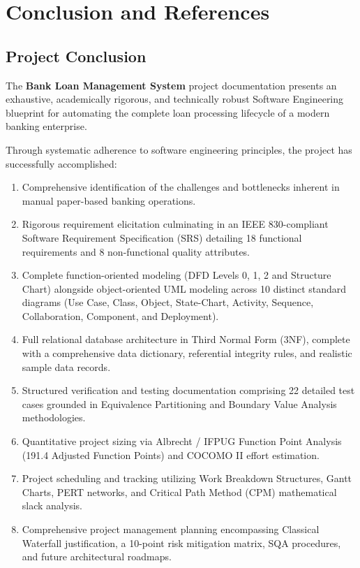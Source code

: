 \chapter{Conclusion and References}

\section{Project Conclusion}

The \textbf{Bank Loan Management System} project documentation presents an exhaustive, academically rigorous, and technically robust Software Engineering blueprint for automating the complete loan processing lifecycle of a modern banking enterprise.

Through systematic adherence to software engineering principles, the project has successfully accomplished:

\begin{enumerate}
  \item Comprehensive identification of the challenges and bottlenecks inherent in manual paper-based banking operations.
  \item Rigorous requirement elicitation culminating in an IEEE 830-compliant Software Requirement Specification (SRS) detailing 18 functional requirements and 8 non-functional quality attributes.
  \item Complete function-oriented modeling (DFD Levels 0, 1, 2 and Structure Chart) alongside object-oriented UML modeling across 10 distinct standard diagrams (Use Case, Class, Object, State-Chart, Activity, Sequence, Collaboration, Component, and Deployment).
  \item Full relational database architecture in Third Normal Form (3NF), complete with a comprehensive data dictionary, referential integrity rules, and realistic sample data records.
  \item Structured verification and testing documentation comprising 22 detailed test cases grounded in Equivalence Partitioning and Boundary Value Analysis methodologies.
  \item Quantitative project sizing via Albrecht / IFPUG Function Point Analysis (191.4 Adjusted Function Points) and COCOMO II effort estimation.
  \item Project scheduling and tracking utilizing Work Breakdown Structures, Gantt Charts, PERT networks, and Critical Path Method (CPM) mathematical slack analysis.
  \item Comprehensive project management planning encompassing Classical Waterfall justification, a 10-point risk mitigation matrix, SQA procedures, and future architectural roadmaps.
\end{enumerate}

